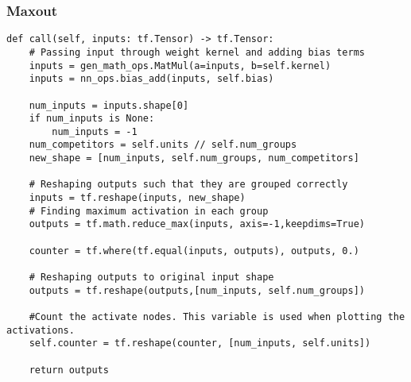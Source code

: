 \subsubsection*{Maxout}
\lstset{style=Python}
\begin{lstlisting}[caption={Python implementation for the custom activation function used to define the maxout layer.},captionpos=b, label={lst:max_out}]
def call(self, inputs: tf.Tensor) -> tf.Tensor:
    # Passing input through weight kernel and adding bias terms
    inputs = gen_math_ops.MatMul(a=inputs, b=self.kernel)
    inputs = nn_ops.bias_add(inputs, self.bias)

    num_inputs = inputs.shape[0]
    if num_inputs is None:
        num_inputs = -1
    num_competitors = self.units // self.num_groups
    new_shape = [num_inputs, self.num_groups, num_competitors]

    # Reshaping outputs such that they are grouped correctly
    inputs = tf.reshape(inputs, new_shape)
    # Finding maximum activation in each group
    outputs = tf.math.reduce_max(inputs, axis=-1,keepdims=True)

    counter = tf.where(tf.equal(inputs, outputs), outputs, 0.)
    
    # Reshaping outputs to original input shape
    outputs = tf.reshape(outputs,[num_inputs, self.num_groups])   

    #Count the activate nodes. This variable is used when plotting the activations.
    self.counter = tf.reshape(counter, [num_inputs, self.units])

    return outputs
\end{lstlisting}
